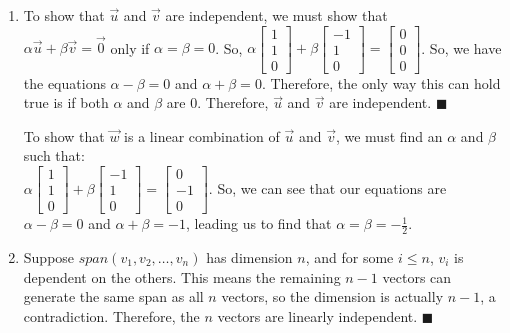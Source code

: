 \documentclass{article}
\newcommand*{\qed}{\hfill\ensuremath{\blacksquare}}
\begin{document}
\begin{enumerate}
\item To show that $\overrightarrow{u}$ and $\overrightarrow{v}$ are independent, we must show that\\
$\alpha \overrightarrow{u} + \beta \overrightarrow{v} = \overrightarrow{0}$ only if $\alpha = \beta = 0$. So, $
\alpha 
\begin{bmatrix}
	1\\
	1\\
	0
\end{bmatrix}
+ \beta 
\begin{bmatrix}
	-1\\
	1\\
	0
\end{bmatrix}
= 
\begin{bmatrix}
	0\\
	0\\
	0
\end{bmatrix}
$. So, we have the equations $\alpha - \beta = 0$ and $\alpha + \beta = 0$. Therefore, the only way this can hold true is if both $\alpha$ and $\beta$ are 0. Therefore, $\overrightarrow{u}$ and $\overrightarrow{v}$ are independent. \qed

To show that $\overrightarrow{w}$ is a linear combination of $\overrightarrow{u}$ and $\overrightarrow{v}$, we must find an $\alpha$ and $\beta$ such that:\\
$
\alpha 
\begin{bmatrix}
	1\\
	1\\
	0
\end{bmatrix}
+ \beta 
\begin{bmatrix}
	-1\\
	1\\
	0
\end{bmatrix}
= 
\begin{bmatrix}
	0\\
	-1\\
	0
\end{bmatrix}
$. So, we can see that our equations are $\alpha - \beta = 0$ and $\alpha + \beta = -1$, leading us to find that $\alpha = \beta = -\frac{1}{2}$. 

\item Suppose $span(v_1, v_2, \dots, v_n)$ has dimension $n$, and for some $i \leq n$, $v_i$ is dependent on the others. This means the remaining $n-1$ vectors can generate the same span as all $n$ vectors, so the dimension is actually $n-1$, a contradiction. Therefore, the $n$ vectors are linearly independent. \qed


\end{enumerate}
\end{document}
